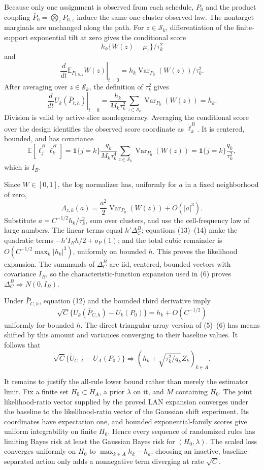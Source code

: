 Because only one assignment is observed from each schedule, \(P_0\) and the product coupling \(\bar P_0=\bigotimes_zP_{0,z}\) induce the same one-cluster observed law.  The nontarget marginals are unchanged along the path.  For \(z\in\mathcal S_k\), differentiation of the finite-support exponential tilt at zero gives the conditional score
\[
 h_k\{W(z)-\mu_z\}/\tau_k^2
\]
and
\[
 \left.\frac{d}{dt}\mathbb E_{P_{t,h,z}}W(z)\right|_{t=0}
 =h_k\operatorname{Var}_{P_0}(W(z))/\tau_k^2.
\]
After averaging over \(z\in\mathcal S_k\), the definition of \(\tau_k^2\) gives
\[
 \left.\frac{d}{dt}U_k(\bar P_{t,h})\right|_{t=0}
 =\frac{h_k}{M_k\tau_k^2}\sum_{z\in\mathcal S_k}\operatorname{Var}_{P_0}(W(z))=h_k. \tag{12}
\]
Division is valid by active-slice nondegeneracy.  Averaging the conditional score over the design identifies the observed score coordinate as \(\dot\ell_k^B\).  It is centered, bounded, and has covariance
\[
 \mathbb E[\dot\ell_j^B\dot\ell_k^B]
 ={\mathbf 1}\{j=k\}\frac{q_k}{M_k\tau_k^4}
 \sum_{z\in\mathcal S_k}\operatorname{Var}_{P_0}(W(z))
 ={\mathbf 1}\{j=k\}\frac{q_k}{\tau_k^2}, \tag{13}
\]
which is \(I_B\).

Since \(W\in[0,1]\), the log normalizer has, uniformly for \(a\) in a fixed neighborhood of zero,
\[
 \Lambda_{z,k}(a)=\frac{a^2}{2}\operatorname{Var}_{P_0}(W(z))+O(|a|^3). \tag{14}
\]
Substitute \(a=C^{-1/2}h_k/\tau_k^2\), sum over clusters, and use the cell-frequency law of large numbers.  The linear terms equal \(h'\Delta_C^B\); equations (13)--(14) make the quadratic terms \(-h'I_Bh/2+o_P(1)\); and the total cubic remainder is \(O(C^{-1/2}\max_k|h_k|^3)\), uniformly on bounded \(h\).  This proves the likelihood expansion.  The summands of \(\Delta_C^B\) are iid, centered, bounded vectors with covariance \(I_B\), so the characteristic-function expansion used in (6) proves \(\Delta_C^B\Rightarrow N(0,I_B)\).

Under \(\bar P_{C,h}\), equation (12) and the bounded third derivative imply
\[
 \sqrt C\{U_k(\bar P_{C,h})-U_k(P_0)\}=h_k+O(C^{-1/2})
\]
uniformly for bounded \(h\).  The direct triangular-array version of (5)--(6) has means shifted by this amount and variances converging to their baseline values.  It follows that
\[
 \sqrt C\{\widetilde U_{C,A}-U_A(P_0)\}\Rightarrow
 (h_k+\sqrt{\tau_k^2/q_k}Z_k)_{k\in A}. \tag{15}
\]

It remains to justify the all-rule lower bound rather than merely the estimator limit.  Fix a finite set \(H_0\subset H_A\), a prior \(\lambda\) on it, and \(M\) containing \(H_0\).  The joint likelihood-ratio vector supplied by the proved LAN expansion converges under the baseline to the likelihood-ratio vector of the Gaussian shift experiment.  Its coordinates have expectation one, and bounded exponential-family scores give uniform integrability on finite \(H_0\).  Hence every sequence of randomized rules has limiting Bayes risk at least the Gaussian Bayes risk for \((H_0,\lambda)\).  The scaled loss converges uniformly on \(H_0\) to \(\max_{k\in A}h_k-h_a\); choosing an inactive, baseline-separated action only adds a nonnegative term diverging at rate \(\sqrt C\).


